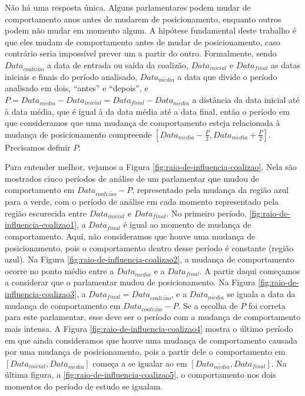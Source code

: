 \documentclass[a4paper,titlepage]{ppgi}\usepackage[]{graphicx}\usepackage[]{color}
\begin{document}
Não há uma resposta única. Alguns parlamentares podem mudar de comportamento
anos antes de mudarem de posicionamento, enquanto outros podem não mudar em
momento algum. A hipótese fundamental deste trabalho é que eles mudam de
comportamento antes de mudar de posicionamento, caso contrário seria impossível
prever um a partir do outro. Formalmente, sendo $Data_{coaliz\tilde{a}o}$ a
data de entrada ou saída da coalizão, $Data_{inicial}$ e $Data_{final}$ as
datas iniciais e finais do período analisado, $Data_{m\acute{e}dia}$ a data que
divide o período analisado em dois, ``antes'' e ``depois'', e $P =
Data_{m\acute{e}dia} - Data_{inicial} = Data_{final} -
Data_{m\acute{e}dia}$ a distância da data inicial até à data média, que é igual
à da data média até a data final, então o período em que consideramos que uma
mudança de comportamento esteja relacionada à mudança de posicionamento
compreende $\left[Data_{m\acute{e}dia} - \frac{P}{2}, Data_{m\acute{e}dia} +
\frac{P}{2}\right]$. Precisamos definir $P$.

Para entender melhor, vejamos a Figura \ref{fig:raio-de-influencia-coalizao}.
Nela são mostrados cinco períodos de análise de um parlamentar que mudou de
comportamento em $Data_{coaliz\tilde{a}o} - P$, representado pela mudança da
região azul para a verde, com o período de análise em cada momento representado
pela região escurecida entre $Data_{inicial}$ e $Data_{final}$. No primeiro
período, \ref{fig:raio-de-influencia-coalizao1}, a $Data_{final}$ é igual ao
momento de mudança de comportamento. Aqui, não consideramos que houve uma
mudança de posicionamento, pois o comportamento dentro desse período é
constante (região azul). Na Figura \ref{fig:raio-de-influencia-coalizao2}, a
mudança de comportamento ocorre no ponto médio entre a $Data_{m\acute{e}dia}$ e
a $Data_{final}$. A partir daqui começamos a considerar que o parlamentar mudou
de posicionamento. Na Figura \ref{fig:raio-de-influencia-coalizao3}, a
$Data_{final} = Data_{coaliz\tilde{a}o}$, e a $Data_{m\acute{e}dia}$ se iguala
a data da mudança de comportamento em $Data_{coaliz\tilde{a}o} - P$. Se a
escolha de $P$ foi correta para este parlamentar, esse deve ser o período com a
mudança de comportamento mais intensa. A Figura
\ref{fig:raio-de-influencia-coalizao4} mostra o último período em que ainda
consideramos que houve uma mudança de comportamento causada por uma mudança de
posicionamento, pois a partir dele o comportamento em $\left[Data_{inicial},
Data_{m\acute{e}dia}\right]$ começa a se igualar ao em
$\left[Data_{m\acute{e}dia}, Data_{final}\right]$. Na última figura, a
\ref{fig:raio-de-influencia-coalizao5}, o comportamento nos dois momentos do
período de estudo se igualam.
\end{document}
